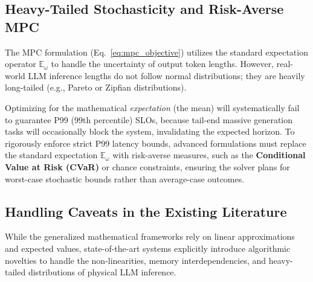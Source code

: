 \documentclass[11pt]{article}
\begin{document}
\subsection{Heavy-Tailed Stochasticity and Risk-Averse MPC}
\label{subsec:caveat_heavy_tails}

The MPC formulation (Eq.~\ref{eq:mpc_objective}) utilizes the standard expectation operator $\mathbb{E}_{\omega}$ to handle the uncertainty of output token lengths. However, real-world LLM inference lengths do not follow normal distributions; they are heavily long-tailed (e.g., Pareto or Zipfian distributions). 

Optimizing for the mathematical \textit{expectation} (the mean) will systematically fail to guarantee P99 (99th percentile) SLOs, because tail-end massive generation tasks will occasionally block the system, invalidating the expected horizon. To rigorously enforce strict P99 latency bounds, advanced formulations must replace the standard expectation $\mathbb{E}_{\omega}$ with risk-averse measures, such as the \textbf{Conditional Value at Risk (CVaR)} or chance constraints, ensuring the solver plans for worst-case stochastic bounds rather than average-case outcomes.

\subsection{Handling Caveats in the Existing Literature}
\label{subsec:literature_handling_caveats}

While the generalized mathematical frameworks rely on linear approximations and expected values, state-of-the-art systems explicitly introduce algorithmic novelties to handle the non-linearities, memory interdependencies, and heavy-tailed distributions of physical LLM inference.
\end{document}
